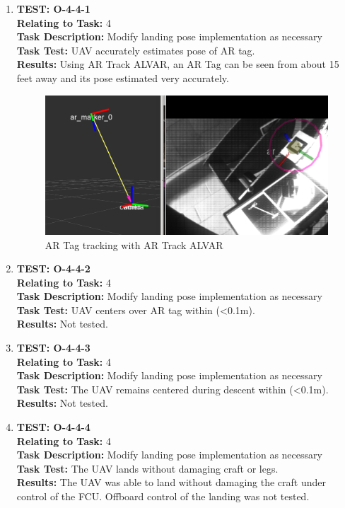 \begin{enumerate}
\item \textbf{TEST: O-4-4-1}\\
\textbf{Relating to Task:} 4\\
\textbf{Task Description:} Modify landing pose implementation as necessary\\
\textbf{Task Test:} UAV accurately estimates pose of AR tag.\\
\textbf{Results:} Using AR Track ALVAR, an AR Tag can be seen from about 15 feet away and its pose estimated very accurately.

\begin{figure}[H]
\centering
\includegraphics[width=\textwidth]{images/poseEstimation.png}
\caption{AR Tag tracking with AR Track ALVAR}
\label{fig:artrack}
\end{figure}

\item \textbf{TEST: O-4-4-2}\\
\textbf{Relating to Task:} 4\\
\textbf{Task Description:} Modify landing pose implementation as necessary\\
\textbf{Task Test:} UAV centers over AR tag within (\textless 0.1m).\\
\textbf{Results:} Not tested.

\item \textbf{TEST: O-4-4-3}\\
\textbf{Relating to Task:} 4\\
\textbf{Task Description:} Modify landing pose implementation as necessary\\
\textbf{Task Test:} The UAV remains centered during descent within (\textless 0.1m).\\
\textbf{Results:} Not tested.

\item \textbf{TEST: O-4-4-4}\\
\textbf{Relating to Task:} 4\\
\textbf{Task Description:} Modify landing pose implementation as necessary\\
\textbf{Task Test:} The UAV lands without damaging craft or legs.\\
\textbf{Results:} The UAV was able to land without damaging the craft under control of the FCU. Offboard control of the landing was not tested.
\end{enumerate}

